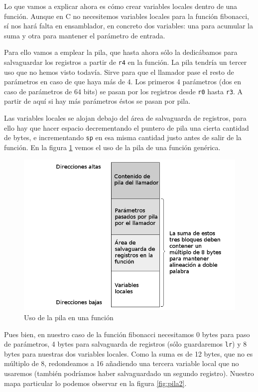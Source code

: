 Lo que vamos a explicar ahora es cómo crear variables locales dentro de una función. Aunque en
C no necesitemos variables locales para la función fibonacci, sí nos hará falta en ensamblador,
en concreto dos variables: una para acumular la suma y otra para mantener el parámetro de entrada.

Para ello vamos a emplear la pila, que hasta ahora sólo la dedicábamos para salvaguardar los
registros a partir de {\tt r4} en la función. La pila tendría un tercer uso que no hemos visto
todavía. Sirve para que el llamador pase el resto de parámetros en caso de que haya más de 4.
Los primeros 4 parámetros (dos en caso de parámetros de 64 bits) se pasan por los registros
desde {\tt r0} hasta {\tt r3}. A partir de aquí si hay más parámetros éstos se pasan por pila.

Las variables locales se alojan debajo del área de salvaguarda de registros, para ello hay que
hacer espacio decrementando el puntero de pila una cierta cantidad de bytes, e incrementando
{\tt sp} en esa misma cantidad justo antes de salir de la función. En la figura \ref{fig:pila}
vemos el uso de la pila de una función genérica.

\begin{figure}[h]
  \centering
    \includegraphics[width=14cm]{graphs/pila.png}
  \caption{Uso de la pila en una función}
  \label{fig:pila}
\end{figure}

Pues bien, en nuestro caso de la función fibonacci necesitamos 0 bytes para paso de parámetros,
4 bytes para salvaguarda de registros (sólo guardaremos {\tt lr}) y 8 bytes para nuestras
dos variables locales. Como la suma es de 12 bytes, que no es múltiplo de 8, redondeamos a 16
añadiendo una tercera variable local que no usaremos (también podríamos haber salvaguardado un
segundo registro). Nuestro mapa particular lo podemos observar en la figura \ref{fig:pila2}.


